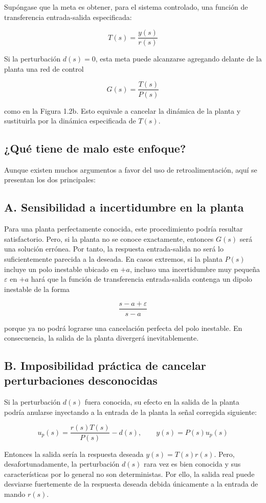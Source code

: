 Supóngase que la meta es obtener, para el sistema controlado, una función de transferencia entrada-salida especificada:

\[
T(s) = \frac{y(s)}{r(s)} \tag{1.2}
\]

Si la perturbación \(d(s)=0\), esta meta puede alcanzarse agregando delante de la planta una red de control

\[
G(s)=\frac{T(s)}{P(s)}
\]

como en la Figura 1.2b. Esto equivale a cancelar la dinámica de la planta y sustituirla por la dinámica especificada de \(T(s)\).

\subsection{¿Qué tiene de malo este enfoque?}
Aunque existen muchos argumentos a favor del uso de retroalimentación, aquí se presentan los dos principales:

\subsection{A. Sensibilidad a incertidumbre en la planta}
Para una planta perfectamente conocida, este procedimiento podría resultar satisfactorio. Pero, si la planta no se conoce exactamente, entonces \(G(s)\) será una solución errónea. Por tanto, la respuesta entrada-salida no será lo suficientemente parecida a la deseada. En casos extremos, si la planta \(P(s)\) incluye un polo inestable ubicado en \(+a\), incluso una incertidumbre muy pequeña \(\varepsilon\) en \(+a\) hará que la función de transferencia entrada-salida contenga un dipolo inestable de la forma

\[
\frac{s-a+\varepsilon}{s-a}
\]

porque ya no podrá lograrse una cancelación perfecta del polo inestable. En consecuencia, la salida de la planta divergerá inevitablemente.

\subsection{B. Imposibilidad práctica de cancelar perturbaciones desconocidas}
Si la perturbación \(d(s)\) fuera conocida, su efecto en la salida de la planta podría anularse inyectando a la entrada de la planta la señal corregida siguiente:

\[
 u_p(s) = \frac{r(s)T(s)}{P(s)} - d(s), \qquad y(s)=P(s)u_p(s) \tag{1.3}
\]

Entonces la salida sería la respuesta deseada \(y(s)=T(s)r(s)\). Pero, desafortunadamente, la perturbación \(d(s)\) rara vez es bien conocida y sus características por lo general no son deterministas. Por ello, la salida real puede desviarse fuertemente de la respuesta deseada debida únicamente a la entrada de mando \(r(s)\).

